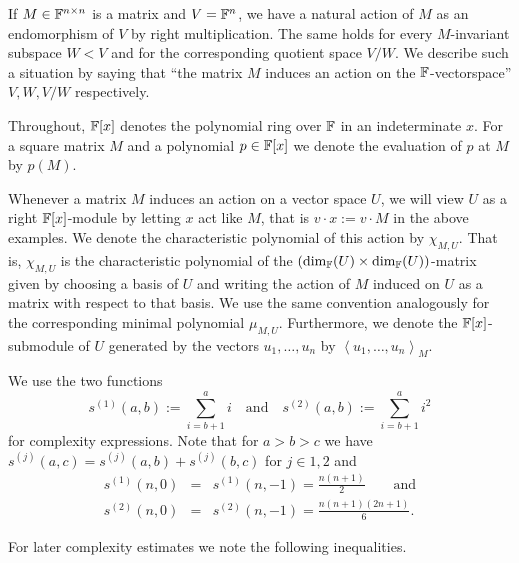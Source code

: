 If $M \in \mathbb{F}^{n \times n}$ is a matrix and $V = \mathbb{F}^n$, we have a
natural action of $M$ as an endomorphism of $V$ by right multiplication.
The same holds for every $M$-invariant subspace $W < V$ and for
the corresponding quotient space $V/W$. We describe such a situation
by saying that ``the matrix $M$ induces an action on the $\mathbb{F}$-vectorspace''
$V, W, V/W$ respectively.

Throughout, $\mathbb{F}[x]$ denotes
the polynomial ring over $\mathbb{F}$ in an indeterminate $x$. For a square matrix $M$ and
a polynomial $p \in \mathbb{F}[x]$ we denote the evaluation of $p$ at $M$
by $p(M)$.

Whenever a matrix $M$ induces an action on a vector space $U$, we
will view $U$ as a right $\mathbb{F}[x]$-module by letting $x$ act like $M$,
that is $v \cdot x := v\cdot M$ in the above examples. We denote the
characteristic polynomial of this action by $\chi_{M,U}$. That is,
$\chi_{M,U}$ is the characteristic polynomial 
of the $(\dim_{\mathbb{F}}(U) \times \dim_{\mathbb{F}}(U))$-matrix given by choosing 
a basis of $U$ and writing the
action of $M$ induced on $U$ as a matrix with respect to that basis.
We use the same convention analogously for the corresponding minimal
polynomial $\mu_{M,U}$. Furthermore, we denote the $\mathbb{F}[x]$-submodule of
$U$ generated by the vectors $u_1, \ldots, u_n$ by $\left< u_1, \ldots,
u_n \right>_M$.

We use the two functions 
\begin{equation}\label{si}
s^{(1)}(a,b) := \sum_{i=b+1}^a i\quad \mbox{and}\quad
s^{(2)}(a,b) := \sum_{i=b+1}^a i^2
\end{equation}
for complexity expressions.
Note that for $a > b > c$ we have $s^{(j)}(a,c) = s^{(j)}(a,b) + s^{(j)}(b,c)$
for $j \in {1,2}$ and 
\begin{eqnarray}
\label{formels1}
s^{(1)}(n,0) &=& s^{(1)}(n,-1) = \frac{n(n+1)}{2}
\qquad\mbox{and} \\
\label{formels2}
s^{(2)}(n,0) &=& s^{(2)}(n,-1) = \frac{n(n+1)(2n+1)}{6}.
\end{eqnarray}

For later complexity estimates we note the following inequalities.

